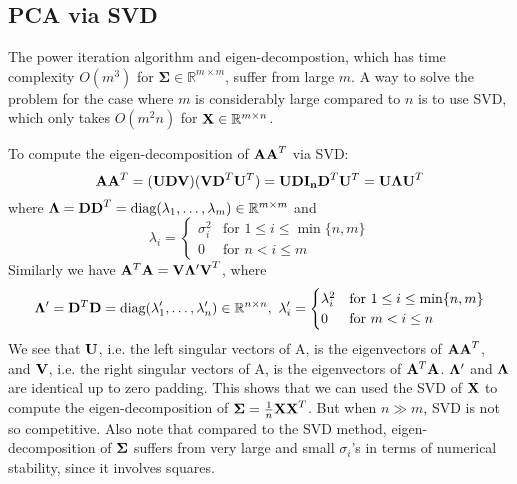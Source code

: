 \documentclass[../main.tex]{subfiles}
\begin{document}
\subsection{PCA via SVD}
The power iteration algorithm and eigen-decompostion, which has time complexity $O(m^3)$ for $\bm{\Sigma}\in\mathbb{R}^{m\times m}$, suffer from large $m$. A way to solve the problem for the case where $m$ is considerably large compared to $n$ is to use SVD, which only takes $O(m^2n)$ for ${\bf X}\in \mathbb{R}^{m\times n}$.
\par To compute the eigen-decomposition of ${\bf AA}^T$ via SVD:
\begin{equation*}
{\bf AA}^T = ({\bf UDV})({\bf VD}^T{\bf U}^T) = {\bf UDI_nD}^T{\bf U}^T = {\bf U\Lambda U}^T
\end{equation*}
where ${\bf \Lambda} = {\bf DD}^T=\text{diag}(\lambda_1,\dots,\lambda_m)\in\mathbb{R}^{m\times m}$ and
\begin{equation*}
\lambda_i=\begin{cases}
\sigma_i^2& \text{for }1\leq i \leq \min\{n,m\}\\
0& \text{for }n< i \leq m
\end{cases}
\end{equation*}
Similarly we have ${\bf A}^T{\bf A}={\bf V\Lambda'V}^T$, where
\begin{equation*}
{\bf \Lambda'} = {\bf D}^T{\bf D} = \text{diag}(\lambda'_1,\dots,\lambda'_n)\in\mathbb{R}^{n\times n},\ \lambda'_i=\begin{cases}
\lambda_i^2& \text{for }1\leq i \leq \min\{n,m\}\\
0& \text{for }m< i \leq n
\end{cases}
\end{equation*}
We see that ${\bf U}$, i.e. the left singular vectors of A, is the eigenvectors of ${\bf AA}^T$, and ${\bf V}$, i.e. the right singular vectors of A, is the eigenvectors of ${\bf A}^T{\bf A}$. ${\bf \Lambda}'$ and ${\bf \Lambda}$ are identical up to zero padding. This shows that we can used the SVD of ${\bf X}$ to compute the eigen-decomposition of ${\bf \Sigma}=\frac{1}{n}{\bf XX}^T$. But when $n \gg m$, SVD is not so competitive. Also note that compared to the SVD method, eigen-decomposition of ${\bf \Sigma}$ suffers from very large and small $\sigma_i$'s in terms of numerical stability, since it involves squares.
\end{document}
